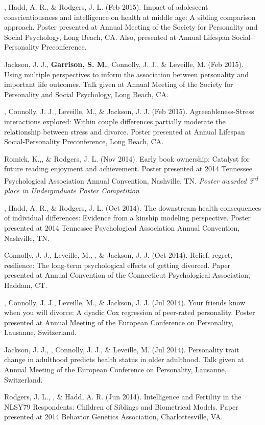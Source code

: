 \item \meb, Hadd, A. R., \& Rodgers, J. L. (Feb 2015). Impact of adolescent conscientiousness and intelligence on health at middle age: A sibling comparison approach. Poster presented at Annual Meeting of the Society for Personality and Social Psychology, Long Beach, CA. Also, presented at Annual Lifespan Social-Personality Preconference.
\item Jackson, J. J., \textbf{Garrison, S. M.}, Connolly, J. J., \& Leveille, M. (Feb 2015). Using multiple perspectives to inform the association between personality and important life outcomes. Talk given at Annual Meeting of the Society for Personality and Social Psychology, Long Beach, CA.
\item\meb, Connolly, J. J., Leveille, M., \& Jackson, J. J. (Feb 2015). Agreeableness-Stress interactions explored: Within couple differences partially moderate the relationship between stress and divorce. Poster presented at Annual Lifespan Social-Personality Preconference, Long Beach, CA.
%
\item Romick, K.,\student \meb, \& Rodgers, J. L. (Nov 2014). Early book ownership: Catalyst for future reading enjoyment and achievement. Poster presented at 2014 Tennessee Psychological Association Annual Convention, Nashville, TN. \textit{Poster awarded 3\textsuperscript{rd} place in Undergraduate Poster Competition}
\item\meb, Hadd, A. R., \& Rodgers, J. L. (Oct 2014). The downstream health consequences of individual differences: Evidence from a kinship modeling perspective. Poster presented at 2014 Tennessee Psychological Association Annual Convention, Nashville, TN.
\item Connolly, J. J., Leveille, M., \meb, \& Jackson, J. J. (Oct 2014). Relief, regret, resilience: The long-term psychological effects of getting divorced. Paper presented at Annual Convention of the Connecticut Psychological Association, Haddam, CT.
\item\meb, Connolly, J. J., Leveille, M., \& Jackson, J. J. (Jul 2014). Your friends know when you will divorce: A dyadic Cox regression of peer-rated personality. Poster presented at Annual Meeting of the European Conference on Personality, Lausanne, Switzerland.
\item Jackson, J. J., \meb, Connolly, J. J., \& Leveille, M. (Jul 2014). Personality trait change in adulthood predicts health status in older adulthood. Talk given at Annual Meeting of the European Conference on Personality, Lausanne, Switzerland.
\item Rodgers, J. L., \meb, \& Hadd, A. R. (Jun 2014). Intelligence and Fertility in the NLSY79 Respondents: Children of Siblings and Biometrical Models. Paper presented at 2014 Behavior Genetics Association, Charlottesville, VA. 

